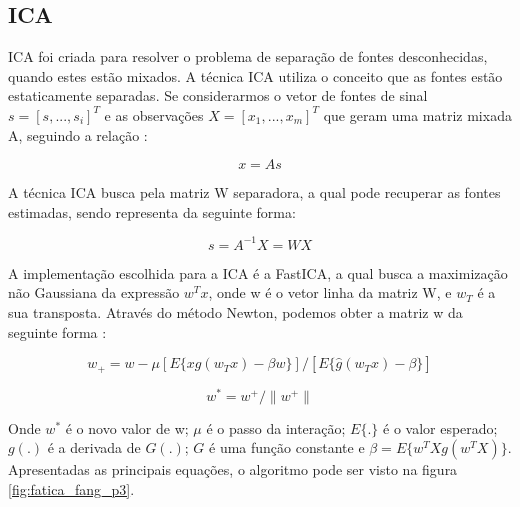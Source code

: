 % 

\subsection{ICA}

ICA foi criada para resolver o problema de separação de fontes desconhecidas, quando estes estão mixados. A técnica ICA utiliza o conceito
que as fontes estão estaticamente separadas. Se considerarmos o vetor de fontes de sinal $s=[s,...,s_i]^T$ e as observações
$X = [x_1,...,x_m]^T$ que geram uma matriz mixada A, seguindo a relação \cite{Duan2017}:

\begin{equation}\label{eq:ica_1}
    x = As
\end{equation}

A técnica ICA busca pela matriz W separadora, a qual pode recuperar as fontes estimadas, sendo representa da seguinte forma: 

\begin{equation}\label{eq:ica_2}
    s = A^{-1}X = WX
\end{equation}

A implementação escolhida para a ICA é a FastICA, a qual busca a maximização não Gaussiana da expressão $w^Tx$, onde w é o vetor linha
da matriz W, e $w_T$ é a sua transposta. Através do método Newton, podemos obter a matriz w da seguinte forma \cite{Duan2017}:

\begin{equation}\label{eq:ica_3}
    w_+ = w - \mu[E\{xg(w_Tx)-\beta w\}] /[E\{\hat{g}(w_Tx)-\beta\}]
\end{equation}

\begin{equation}\label{eq:ica_4}
    w^* = w^+/\parallel w^+\parallel
\end{equation}

Onde $w^*$ é o novo valor de w; $\mu$ é o passo da interação; $E\{.\}$ é o valor esperado; $g(.)$ é a derivada de $G(.)$; $G$ é uma
função constante e $\beta = E\{w^T Xg(w^T X)\}$.
Apresentadas as principais equações, o algoritmo pode ser visto na figura \ref{fig:fatica_fang_p3}.

